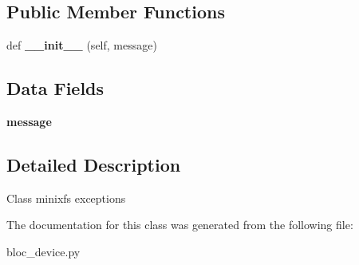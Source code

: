 \subsection*{Public Member Functions}
\begin{DoxyCompactItemize}
\item 
\hypertarget{classbloc__device_1_1_my_base_exception_a692fa1576e9775a92420b5656e2c00a8}{}def {\bfseries \+\_\+\+\_\+init\+\_\+\+\_\+} (self, message)\label{classbloc__device_1_1_my_base_exception_a692fa1576e9775a92420b5656e2c00a8}

\end{DoxyCompactItemize}
\subsection*{Data Fields}
\begin{DoxyCompactItemize}
\item 
\hypertarget{classbloc__device_1_1_my_base_exception_ab8140947611504abcb64a4c277effcf5}{}{\bfseries message}\label{classbloc__device_1_1_my_base_exception_ab8140947611504abcb64a4c277effcf5}

\end{DoxyCompactItemize}


\subsection{Detailed Description}
\begin{DoxyVerb}Class minixfs exceptions  \end{DoxyVerb}
 

The documentation for this class was generated from the following file\+:\begin{DoxyCompactItemize}
\item 
bloc\+\_\+device.\+py\end{DoxyCompactItemize}
